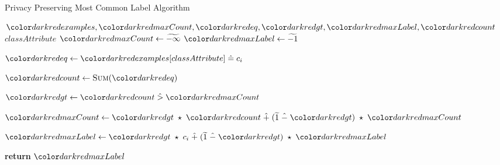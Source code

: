 \begin{algorithm}[H]
\caption{Privacy Preserving Most Common Label Algorithm}\label{a:id3-most-common-label-pp}
\begin{algorithmic}[1]
\renewcommand{\algorithmicrequire}{\textbf{Private Vars:}}
\Require $\red{examples}, \red{maxCount}, \red{eq}, \red{gt}, \red{maxLabel}, \red{count}$
\renewcommand{\algorithmicrequire}{\textbf{Global Vars:}}
\Require $classAttribute$
  \State $\red{maxCount} \gets \enc{-\infty}$
  \State $\red{maxLabel} \gets \enc{-1}$


      \State $\red{eq} \gets \red{examples}[classAttribute] \heq c_i$ 

      \State $\red{count} \gets \textsc{Sum}(\red{eq})$

      \State $\red{gt} \gets \red{count} \hgt  \red{maxCount}$

      \State $\red{maxCount} \gets \red{gt} \hmul \red{count} \hplus (\enc{1} \hminus \red{gt}) \hmul \red{maxCount}$ 

      \State $\red{maxLabel} \gets \red{gt} \hmul c_i \hplus (\enc{1} \hminus \red{gt}) \hmul \red{maxLabel}$


    \EndFor

    \State \textbf{return} $\red{maxLabel}$
\EndProcedure
\end{algorithmic}
\end{algorithm}
